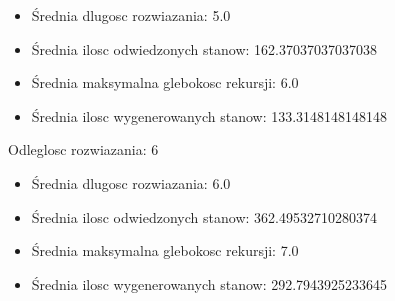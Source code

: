 \documentclass{classrep}
\begin{document}
		\begin{itemize}
			\item Średnia dlugosc rozwiazania: 5.0
			\item Średnia ilosc odwiedzonych stanow: 162.37037037037038
			\item Średnia maksymalna glebokosc rekursji: 6.0
			\item Średnia ilosc wygenerowanych stanow: 133.3148148148148
		\end{itemize}
		Odleglosc rozwiazania: 6
		\begin{itemize}
			\item Średnia dlugosc rozwiazania: 6.0
			\item Średnia ilosc odwiedzonych stanow: 362.49532710280374
			\item Średnia maksymalna glebokosc rekursji: 7.0
			\item Średnia ilosc wygenerowanych stanow: 292.7943925233645
		\end{itemize}
		
\end{document}
